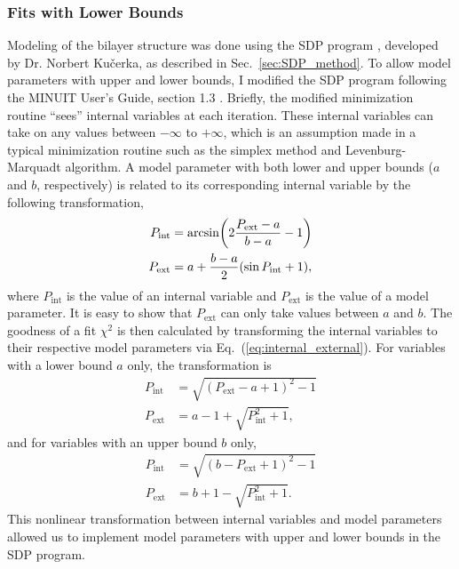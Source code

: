 \subsubsection{Fits with Lower Bounds}
Modeling of the bilayer structure was done using the SDP program \cite{Kucerka08},
developed by Dr. Norbert Ku\v{c}erka, 
as described in Sec.~\ref{sec:SDP_method}.
To allow model parameters with upper and lower bounds, I modified the
SDP program following the MINUIT User's Guide, section 1.3 
\cite{minuit}. 
Briefly, the modified minimization routine ``sees'' internal variables 
at each iteration. These internal variables can take on
any values between $-\infty$ to $+\infty$, which is an assumption made
in a typical minimization routine such as 
the simplex method and Levenburg-Marquadt algorithm.
A model parameter with both lower and upper bounds ($a$ and $b$, respectively) 
is related to its corresponding internal variable by the following transformation,
\begin{align}
  P_\textrm{int} &= \arcsin \mathopen{}\left( 2\frac{P_\textrm{ext}-a}{b-a}-1 \right)\mathclose{}  \\
  P_\textrm{ext} &= a + \frac{b-a}{2}(\sin P_\textrm{int}+1),
  \label{eq:internal_external}
\end{align}
where $P_\text{int}$ is the value of an internal variable and
$P_\text{ext}$ is the value of a model parameter. It is easy to show that
$P_\text{ext}$ can only take values between $a$ and $b$.
The goodness of a fit $\chi^2$ is then calculated by transforming the
internal variables to their respective model parameters via Eq.~(\ref{eq:internal_external}). 
For variables with a lower bound $a$ only, the transformation is
\begin{align}
  P_\textrm{int} &= \sqrt{(P_\textrm{ext}-a+1)^2 - 1} \\
  P_\textrm{ext} &= a - 1 + \sqrt{P_\textrm{int}^2+1}, 
\end{align}
and for variables with an upper bound $b$ only,
\begin{align}
  P_\textrm{int} &= \sqrt{(b-P_\textrm{ext}+1)^2 - 1} \\
  P_\textrm{ext} &= b + 1 - \sqrt{P_\textrm{int}^2+1}.
\end{align}
This nonlinear transformation between internal variables and model parameters 
allowed us to implement model parameters with upper and lower bounds in
the SDP program.

